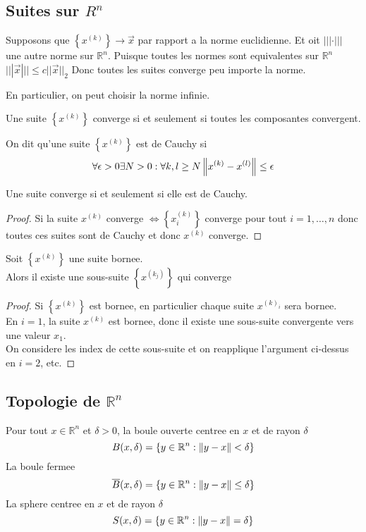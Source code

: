 \documentclass[../main.tex]{subfiles}
\begin{document}
\subsection{Suites sur $R^{n}$}
\begin{rmq}
	Supposons que $ \left\{ x^{( k) } \right\}  \to \vec{x}$ par rapport a la norme euclidienne. Et oit $||| \cdot |||$ une autre norme sur $ \mathbb{R}^n$. Puisque toutes les normes sont equivalentes sur $\mathbb{R}^{n}$ $|||\vec{x}||| \leq c ||\vec{x}||_2$ Donc toutes les suites converge peu importe la norme.
\end{rmq}
En particulier, on peut choisir la norme infinie.
\begin{lemma}
	Une suite $ \left\{ x^{( k) } \right\} $ converge si et seulement si toutes les composantes convergent.
\end{lemma}
\begin{defn}
	On dit qu'une suite $ \left\{ x^{( k) } \right\} $ est de Cauchy si
	\[ 
		\forall \epsilon>0 \exists N>0: \forall k,l \geq N \left\lVert x^{( k) } - x^{( l) }\right\rVert \leq \epsilon
	\]
	
	
\end{defn}
\begin{thm}
	Une suite converge si et seulement si elle est de Cauchy.
\end{thm}
\begin{proof}
	Si la suite $x^{( k )}$ converge $\iff \left\{ x^{( k) }_i \right\} $ converge pour tout $i=1,\ldots,n$ donc toutes ces suites sont de Cauchy et donc $x^{( k) }$ converge.
\end{proof}
\begin{thm}
	Soit $ \left\{ x^{( k) } \right\} $ une suite bornee.\\
	Alors il existe une sous-suite $ \left\{ x^{( k_j) } \right\} $ qui converge
\end{thm}
\begin{proof}
	Si $ \left\{ x^{( k) } \right\} $ est bornee, en particulier chaque suite $x^{( k)_i}$ sera bornee.\\
	En $i=1$, la suite $x^{( k) }$ est bornee, donc il existe une sous-suite convergente vers une valeur $x_1$.\\
	On considere les index de cette sous-suite et on reapplique l'argument ci-dessus en $i=2$, etc.
\end{proof}

\subsection{Topologie de $ \mathbb{R}^n$}
\begin{defn}[Boule]\label{defn:Bouleboule}
	Pour tout $x \in \mathbb{R}^n$ et $\delta>0$, la boule ouverte centree en $x$ et de rayon $\delta$ 
	\[ 
		B( x,\delta) = \left\{  y \in \mathbb{R}^n : \left\lVert y-x\right\rVert < \delta \right\} 
	\]
	La boule fermee 
	\[ 
		\overline{B}( x,\delta) = \left\{  y \in \mathbb{R}^n : \left\lVert y-x\right\rVert \leq \delta \right\} 
	\]
	La sphere centree en $x$ et de rayon  $\delta$
	\[ 
		S( x,\delta) = \left\{  y \in \mathbb{R}^n : \left\lVert y-x\right\rVert = \delta \right\} 
	\]
\end{defn}
\end{document}
